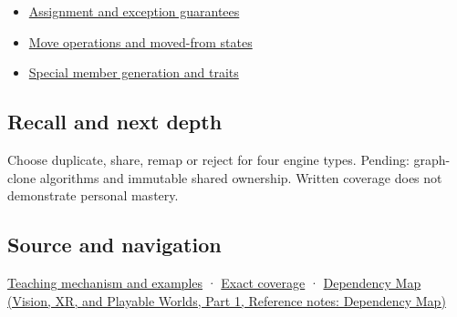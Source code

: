\hypertarget{appendix-1340cd1ce582-used-by}{}

\begin{itemize}
\tightlist
\item
  \hyperref[appendix-bea6beb5350f]{Assignment and exception guarantees}
\item
  \hyperref[appendix-5636651017c2]{Move operations and moved-from states}
\item
  \hyperref[appendix-42e02a12c694]{Special member generation and traits}
\end{itemize}

\subsection{Recall and next depth}\label{appendix-1340cd1ce582-recall-and-next-depth}

\hypertarget{appendix-1340cd1ce582-recall-and-next-depth}{}

Choose duplicate, share, remap or reject for four engine types. Pending: graph-clone algorithms and immutable shared ownership. Written coverage does not demonstrate personal mastery.

\subsection{Source and navigation}\label{appendix-1340cd1ce582-source-and-navigation}

\hypertarget{appendix-1340cd1ce582-source-and-navigation}{}

\hyperref[01-foundations-i-ch003-copy-a-meaning-rather-than-just-its-bytes]{Teaching mechanism and examples} · \hyperref[appendix-fd090d982a15-m009---parts-127-147]{Exact coverage} · \href{../07-Vision-XR-and-Playable-Worlds-P01/main.pdf\#appendix-4ad47bdd269a}{Dependency Map (Vision, XR, and Playable Worlds, Part 1, Reference notes: Dependency Map)}
